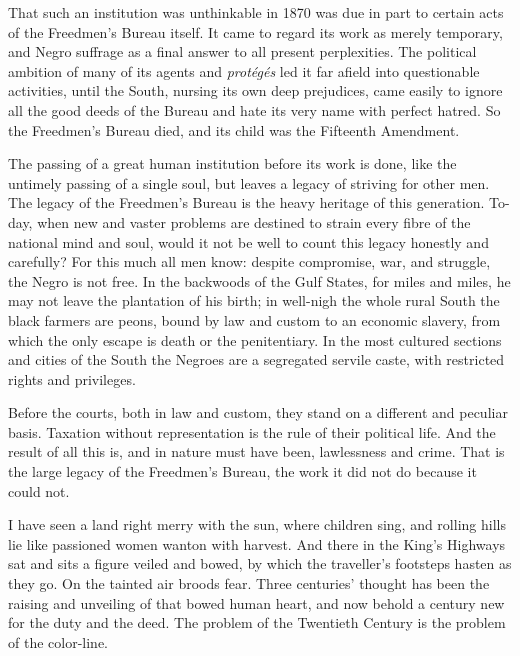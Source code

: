 That such an institution was unthinkable in 1870 was due in part to certain acts of the Freedmen’s Bureau itself. It came to regard its work as merely temporary, and Negro suffrage as a final answer to all present perplexities. The political ambition of many of its agents and \textit{protégés} led it far afield into questionable activities, until the South, nursing its own deep prejudices, came easily to ignore all the good deeds of the Bureau and hate its very name with perfect hatred. So the Freedmen’s Bureau died, and its child was the Fifteenth Amendment.\par

The passing of a great human institution before its work is done, like the untimely passing of a single soul, but leaves a legacy of striving for other men. The legacy of the Freedmen’s Bureau is the heavy heritage of this generation. To-day, when new and vaster problems are destined to strain every fibre of the national mind and soul, would it not be well to count this legacy honestly and carefully? For this much all men know: despite compromise, war, and struggle, the Negro is not free. In the backwoods of the Gulf States, for miles and miles, he may not leave the plantation of his birth; in well-nigh the whole rural South the black farmers are peons, bound by law and custom to an economic slavery, from which the only escape is death or the penitentiary. In the most cultured sections and cities of the South the Negroes are a segregated servile caste, with restricted rights and privileges.\par

Before the courts, both in law and custom, they stand on a different and peculiar basis. Taxation without representation is the rule of their political life. And the result of all this is, and in nature must have been, lawlessness and crime. That is the large legacy of the Freedmen’s Bureau, the work it did not do because it could not.\par

I have seen a land right merry with the sun, where children sing, and rolling hills lie like passioned women wanton with harvest. And there in the King’s Highways sat and sits a figure veiled and bowed, by which the traveller’s footsteps hasten as they go. On the tainted air broods fear. Three centuries’ thought has been the raising and unveiling of that bowed human heart, and now behold a century new for the duty and the deed. The problem of the Twentieth Century is the problem of the color-line.\par

\endgroup

